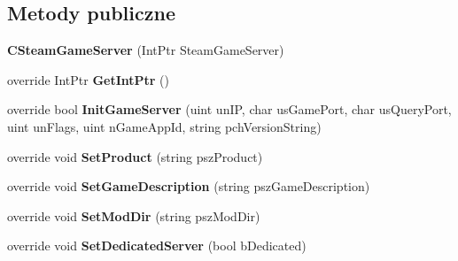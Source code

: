 \subsection*{Metody publiczne}
\begin{DoxyCompactItemize}
\item 
\mbox{\label{class_valve_1_1_steamworks_1_1_c_steam_game_server_a886a578ee56ad9527a4ef484c188bd8a}} 
{\bfseries C\+Steam\+Game\+Server} (Int\+Ptr Steam\+Game\+Server)
\item 
\mbox{\label{class_valve_1_1_steamworks_1_1_c_steam_game_server_ac360bfd65b859fe35ccd19fdf182c452}} 
override Int\+Ptr {\bfseries Get\+Int\+Ptr} ()
\item 
\mbox{\label{class_valve_1_1_steamworks_1_1_c_steam_game_server_a1f1ad89b367f70c1eb476e9a91e096fa}} 
override bool {\bfseries Init\+Game\+Server} (uint un\+IP, char us\+Game\+Port, char us\+Query\+Port, uint un\+Flags, uint n\+Game\+App\+Id, string pch\+Version\+String)
\item 
\mbox{\label{class_valve_1_1_steamworks_1_1_c_steam_game_server_a541d9d6371483059aef3ba911cfb23ce}} 
override void {\bfseries Set\+Product} (string psz\+Product)
\item 
\mbox{\label{class_valve_1_1_steamworks_1_1_c_steam_game_server_afedbaf2a41f5847bcbca65a1f095927a}} 
override void {\bfseries Set\+Game\+Description} (string psz\+Game\+Description)
\item 
\mbox{\label{class_valve_1_1_steamworks_1_1_c_steam_game_server_acf7d79e7ecbbfd72c6c19dcda189875a}} 
override void {\bfseries Set\+Mod\+Dir} (string psz\+Mod\+Dir)
\item 
\mbox{\label{class_valve_1_1_steamworks_1_1_c_steam_game_server_a19e5cbc56f802e634546581af1583c03}} 
override void {\bfseries Set\+Dedicated\+Server} (bool b\+Dedicated)
\item 
\mbox{\label{class_valve_1_1_steamworks_1_1_c_steam_game_server_aa3d158f593f87f600af1009f35d4b128}} 

\end{DoxyCompactItemize}
